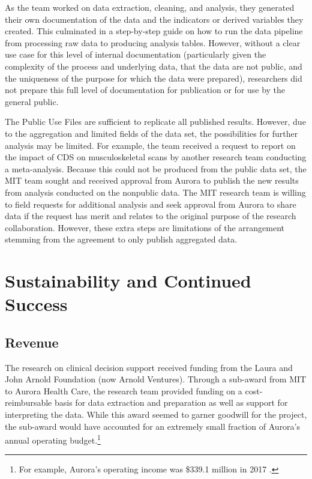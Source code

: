 As the team worked on data extraction, cleaning, and analysis, they generated their own documentation of the data and the indicators or derived variables they created. This culminated in a step-by-step guide on how to run the data pipeline from processing raw data to producing analysis tables. However, without a clear use case for this level of internal documentation (particularly given the complexity of the process and underlying data, that the data are not public, and the uniqueness of the purpose for which the data were prepared), researchers did not prepare this full level of documentation for publication or for use by the general public.

The Public Use Files are sufficient to replicate all published results. However, due to the aggregation and limited fields of the data set, the possibilities for further analysis may be limited. For example, the team received a request to report on the impact of CDS on musculoskeletal scans by another research team conducting a meta-analysis. Because this could not be produced from the public data set, the MIT team sought and received approval from Aurora to publish the new results from analysis conducted on the nonpublic data. The MIT research team is willing to field requests for additional analysis and seek approval from Aurora to share data if the request has merit and relates to the original purpose of the research collaboration. However, these extra steps are limitations of the arrangement stemming from the agreement to only publish aggregated data.

\hypertarget{sustainability-and-continued-success-3}{%
\section{Sustainability and Continued Success}\label{sustainability-and-continued-success-3}}

\hypertarget{revenue-2}{%
\subsection{Revenue}\label{revenue-2}}

The research on clinical decision support received funding from the Laura and John Arnold Foundation (now Arnold Ventures). Through a sub-award from MIT to Aurora Health Care, the research team provided funding on a cost-reimbursable basis for data extraction and preparation as well as support for interpreting the data. While this award seemed to garner goodwill for the project, the sub-award would have accounted for an extremely small fraction of Aurora's annual operating budget.\footnote{For example, Aurora's operating income was \$339.1 million in 2017 \citep[see][]{aurorahealthcareinc.andaffiliates2018}.}

